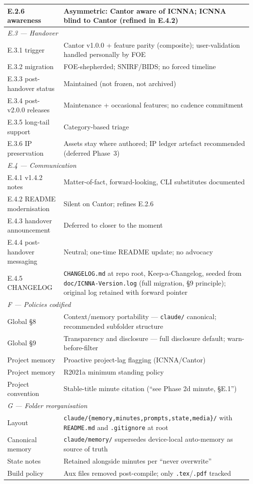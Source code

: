 \documentclass[11pt,a4paper]{article}
\begin{document}
\begin{longtable}{p{3cm}p{11cm}}
E.2.6 awareness & Asymmetric: Cantor aware of ICNNA; ICNNA blind to Cantor (refined in E.4.2) \\
\midrule
\multicolumn{2}{l}{\textit{E.3 --- Handover}} \\
\midrule
E.3.1 trigger & Cantor v1.0.0 + feature parity (composite); user-validation handled personally by FOE \\
E.3.2 migration & FOE-shepherded; SNIRF/BIDS; no forced timeline \\
E.3.3 post-handover status & Maintained (not frozen, not archived) \\
E.3.4 post-v2.0.0 releases & Maintenance + occasional features; no cadence commitment \\
E.3.5 long-tail support & Category-based triage \\
E.3.6 IP preservation & Assets stay where authored; IP ledger artefact recommended (deferred Phase~3) \\
\midrule
\multicolumn{2}{l}{\textit{E.4 --- Communication}} \\
\midrule
E.4.1 v1.4.2 notes & Matter-of-fact, forward-looking, CLI substitutes documented \\
E.4.2 README modernisation & Silent on Cantor; refines E.2.6 \\
E.4.3 handover announcement & Deferred to closer to the moment \\
E.4.4 post-handover messaging & Neutral; one-time README update; no advocacy \\
E.4.5 CHANGELOG & \texttt{CHANGELOG.md} at repo root, Keep-a-Changelog, seeded from \texttt{doc/ICNNA-Version.log} (full migration, §9 principle); original log retained with forward pointer \\
\midrule
\multicolumn{2}{l}{\textit{F --- Policies codified}} \\
\midrule
Global §8 & Context/memory portability --- \texttt{claude/} canonical; recommended subfolder structure \\
Global §9 & Transparency and disclosure --- full disclosure default; warn-before-filter \\
Project memory & Proactive project-lag flagging (ICNNA/Cantor) \\
Project memory & R2021a minimum standing policy \\
Project convention & Stable-title minute citation (``see Phase 2d minute, §E.1'') \\
\midrule
\multicolumn{2}{l}{\textit{G --- Folder reorganisation}} \\
\midrule
Layout & \texttt{claude/\{memory,minutes,prompts,state,media\}/} with \texttt{README.md} and \texttt{.gitignore} at root \\
Canonical memory & \texttt{claude/memory/} supersedes device-local auto-memory as source of truth \\
State notes & Retained alongside minutes per ``never overwrite'' \\
Build policy & Aux files removed post-compile; only \texttt{.tex}/\texttt{.pdf} tracked \\
\bottomrule
\end{longtable}
\end{document}
